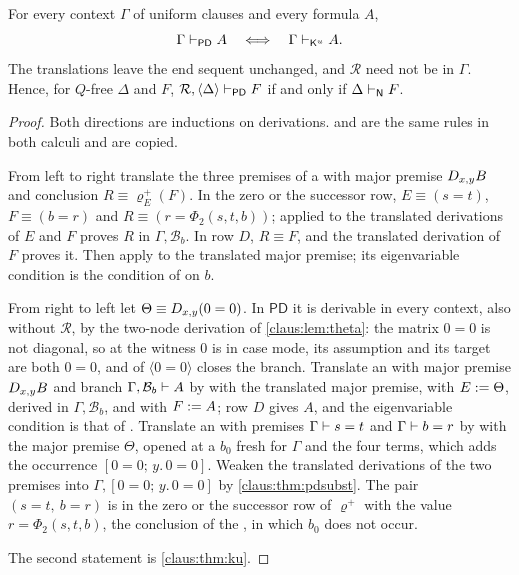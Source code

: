 \begin{theorem}
\label{claus:thm:pd}
For every context $\Gamma$ of uniform clauses and every formula $A$,
\[
 \Gamma\vdash_{\mathsf{PD}}A\quad\Longleftrightarrow\quad
 \Gamma\vdash_{\mathsf{K}^{u}}A .
\]
The translations leave the end sequent unchanged, and $\mathcal{R}$ need
not be in $\Gamma$. Hence, for $Q$-free $\Delta$ and $F$,
$\mathcal{R},\langle\Delta\rangle\vdash_{\mathsf{PD}}F$ if and only if
$\Delta\vdash_{\mathsf{N}}F$.
\end{theorem}
\begin{proof}
Both directions are inductions on derivations.  and
 are the same rules in both calculi and are copied.

From left to right translate the three premises of a 
with major premise $D_{x,y}B$ and conclusion $R\equiv\varrho^{+}_E(F)$.
In the zero or the successor row, $E\equiv(s=t)$, $F\equiv(b=r)$ and
$R\equiv(r=\Phi_2(s,t,b))$;  applied to the translated
derivations of $E$ and $F$ proves $R$ in $\Gamma,\mathcal{B}_b$. In row $D$,
$R\equiv F$, and the translated derivation of $F$ proves it. Then apply
 to the translated major premise; its eigenvariable
condition is the condition of  on $b$.

From right to left let $\Theta\equiv D_{x,y}(0=0)$. In $\mathsf{PD}$ it is
derivable in every context, also without $\mathcal{R}$, by the two-node
derivation of \cref{claus:lem:theta}: the matrix $0=0$ is not diagonal, so
 at the witness $0$ is in case mode, its assumption and its
target are both $0=0$, and  of $\langle 0=0\rangle$ closes the
branch. Translate an  with major premise $D_{x,y}B$ and
branch $\Gamma,\mathcal{B}_b\vdash A$ by  with the
translated major premise, with $E\mathrel{:=}\Theta$, derived in
$\Gamma,\mathcal{B}_b$, and with $F\mathrel{:=} A$; row $D$ gives $A$, and the
eigenvariable condition is that of . Translate an
 with premises $\Gamma\vdash s=t$ and $\Gamma\vdash b=r$
by  with the major premise $\Theta$, opened at a $b_0$
fresh for $\Gamma$ and the four terms, which adds the occurrence
$[0=0;\,y.\,0=0]$. Weaken the translated derivations of the two premises
into $\Gamma,[0=0;\,y.\,0=0]$ by \cref{claus:thm:pdsubst}. The pair
$(s=t,\ b=r)$ is in the zero or the successor row of $\varrho^{+}$ with the
value $r=\Phi_2(s,t,b)$, the conclusion of the , in which
$b_0$ does not occur.

The second statement is \cref{claus:thm:ku}.
\end{proof}

